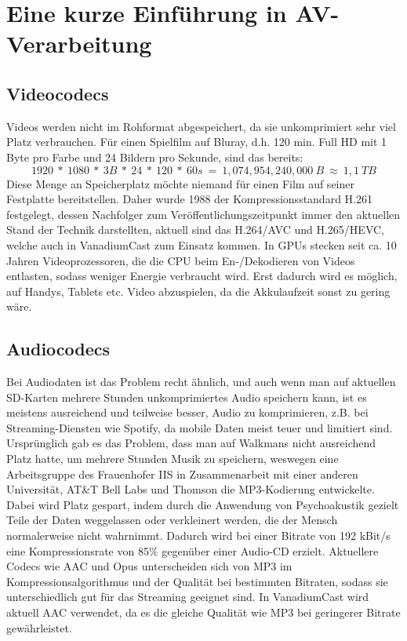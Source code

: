 \documentclass{article}
\begin{document}
    \newpage

    \section{Eine kurze Einführung in AV-Verarbeitung}\label{sec:eine-kurze-einführung-in-av-verarbeitung}

    \subsection{Videocodecs}\label{subsec:videocodecs}

    Videos werden nicht im Rohformat abgespeichert, da sie unkomprimiert
    sehr viel Platz verbrauchen. Für einen Spielfilm auf Bluray, d.h. 120
    min. Full HD mit 1 Byte pro Farbe und 24 Bildern pro Sekunde, sind das
    bereits:
    \[1920\ *\ 1080\ *\ 3B\ *\ 24\ *\ 120\ *\ 60s\ =\ 1,074,954,240,000\ B\ \approx\ 1,1\ TB\]
    Diese Menge an Speicherplatz möchte niemand für einen Film auf seiner
    Festplatte bereitstellen. Daher wurde 1988 der Kompressionsstandard
    H.261 festgelegt, dessen Nachfolger zum Veröffentlichungszeitpunkt immer
    den aktuellen Stand der Technik darstellten, aktuell sind das H.264/AVC
    und H.265/HEVC, welche auch in VanadiumCast zum Einsatz kommen. In GPUs
    stecken seit ca. 10 Jahren Videoprozessoren, die die CPU beim
    En-/Dekodieren von Videos entlasten, sodass weniger Energie verbraucht
    wird. Erst dadurch wird es möglich, auf Handys, Tablets etc. Video
    abzuspielen, da die Akkulaufzeit sonst zu gering wäre.

    \subsection{Audiocodecs}\label{subsec:audiocodecs}

    Bei Audiodaten ist das Problem recht ähnlich, und auch wenn man auf
    aktuellen SD-Karten mehrere Stunden unkomprimiertes Audio speichern
    kann, ist es meistens ausreichend und teilweise besser, Audio zu
    komprimieren, z.B. bei Streaming-Diensten wie Spotify, da mobile Daten
    meist teuer und limitiert sind. Ursprünglich gab es das Problem, dass
    man auf Walkmans nicht ausreichend Platz hatte, um mehrere Stunden Musik
    zu speichern, weswegen eine Arbeitsgruppe des Frauenhofer IIS in
    Zusammenarbeit mit einer anderen Universität, AT\&T Bell Labs und
    Thomson die MP3-Kodierung entwickelte. Dabei wird Platz gespart, indem
    durch die Anwendung von Psychoakustik gezielt Teile der Daten
    weggelassen oder verkleinert werden, die der Mensch normalerweise nicht
    wahrnimmt. Dadurch wird bei einer Bitrate von 192 kBit/s eine
    Kompressionsrate von 85\% gegenüber einer Audio-CD erzielt. Aktuellere
    Codecs wie AAC und Opus unterscheiden sich von MP3 im
    Kompressionsalgorithmus und der Qualität bei bestimmten Bitraten, sodass
    sie unterschiedlich gut für das Streaming geeignet sind. In VanadiumCast
    wird aktuell AAC verwendet, da es die gleiche Qualität wie MP3 bei
    geringerer Bitrate gewährleistet.
\end{document}
